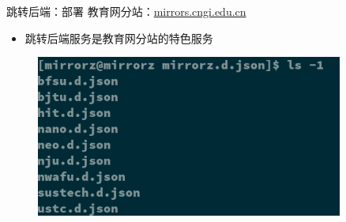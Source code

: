 \documentclass{ctexbeamer}
\begin{document}
\begin{frame}{跳转后端：部署}
  教育网分站：\url{mirrors.cngi.edu.cn}\begin{itemize}
    \item 跳转后端服务是教育网分站的特色服务
  \end{itemize}
  \begin{figure}
    \centering
    \includegraphics[width=0.9\textwidth]{img/mrzdjson.png}
  \end{figure}
\end{frame}
\end{document}
